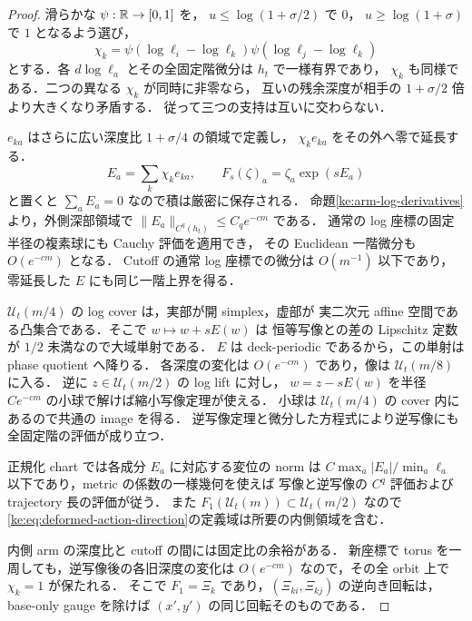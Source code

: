 \begin{proof}
滑らかな $\psi:\mathbb R\to[0,1]$ を，
$u\le\log(1+\sigma/2)$ で $0$，
$u\ge\log(1+\sigma)$ で $1$ となるよう選び，
\[
 \chi_k=\psi(\log\ell_i-\log\ell_k)
          \psi(\log\ell_j-\log\ell_k)
\]
とする．各 $d\log\ell_a$ とその全固定階微分は $h_t$ で一様有界であり，
$\chi_k$ も同様である．二つの異なる $\chi_k$ が同時に非零なら，
互いの残余深度が相手の $1+\sigma/2$ 倍より大きくなり矛盾する．
従って三つの支持は互いに交わらない．

$e_{ka}$ はさらに広い深度比 $1+\sigma/4$ の領域で定義し，
$\chi_k e_{ka}$ をその外へ零で延長する．
\[
 E_a=\sum_k\chi_k e_{ka},\qquad
 F_s(\zeta)_a=\zeta_a\exp(sE_a)
\]
と置くと $\sum_aE_a=0$ なので積は厳密に保存される．
命題\ref{ke:arm-log-derivatives}より，外側深部領域で
$\|E_a\|_{C^q(h_t)}\le C_qe^{-cm}$ である．
通常の log 座標の固定半径の複素球にも Cauchy 評価を適用でき，
その Euclidean 一階微分も $O(e^{-cm})$ となる．
Cutoff の通常 log 座標での微分は $O(m^{-1})$ 以下であり，
零延長した $E$ にも同じ一階上界を得る．

$\mathcal U_t(m/4)$ の log cover は，実部が開 simplex，虚部が
実二次元 affine 空間である凸集合である．そこで $w\mapsto w+sE(w)$ は
恒等写像との差の Lipschitz 定数が $1/2$ 未満なので大域単射である．
$E$ は deck-periodic であるから，この単射は phase quotient へ降りる．
各深度の変化は $O(e^{-cm})$ であり，像は $\mathcal U_t(m/8)$ に入る．
逆に $z\in\mathcal U_t(m/2)$ の log lift に対し，
$w=z-sE(w)$ を半径 $Ce^{-cm}$ の小球で解けば縮小写像定理が使える．
小球は $\mathcal U_t(m/4)$ の cover 内にあるので共通の image を得る．
逆写像定理と微分した方程式により逆写像にも全固定階の評価が成り立つ．

正規化 chart では各成分 $E_a$ に対応する変位の norm は
$C\max_a|E_a|/\min_a\ell_a$ 以下であり，metric の係数の一様幾何を使えば
写像と逆写像の $C^q$ 評価および trajectory 長の評価が従う．
また $F_1(\mathcal U_t(m))\subset\mathcal U_t(m/2)$ なので
\eqref{ke:eq:deformed-action-direction}の定義域は所要の内側領域を含む．

内側 arm の深度比と cutoff の間には固定比の余裕がある．
新座標で torus を一周しても，逆写像後の各旧深度の変化は
$O(e^{-cm})$ なので，その全 orbit 上で $\chi_k=1$ が保たれる．
そこで $F_1=\Xi_k$ であり，$(\Xi_{ki},\Xi_{kj})$ の逆向き回転は，
base-only gauge を除けば $(x',y')$ の同じ回転そのものである．
\end{proof}

